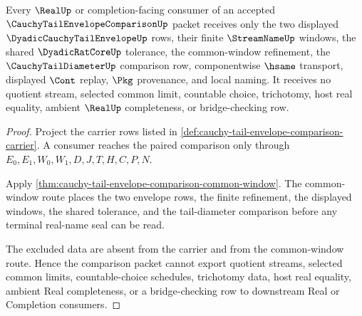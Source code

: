 \begin{theorem}
\label{thm:cauchy-tail-envelope-comparison-nonescape}
Every $\RealUp$ or completion-facing consumer of an accepted $\CauchyTailEnvelopeComparisonUp$ packet receives only the two displayed $\DyadicCauchyTailEnvelopeUp$ rows, their finite $\StreamNameUp$ windows, the shared $\DyadicRatCoreUp$ tolerance, the common-window refinement, the $\CauchyTailDiameterUp$ comparison row, componentwise $\hsame$ transport, displayed $\Cont$ replay, $\Pkg$ provenance, and local naming. It receives no quotient stream, selected common limit, countable choice, trichotomy, host real equality, ambient $\RealUp$ completeness, or bridge-checking row.
\end{theorem}
\begin{proof}
Project the carrier rows listed in \autoref{def:cauchy-tail-envelope-comparison-carrier}. A consumer reaches the paired comparison only through $E_0,E_1,W_0,W_1,D,J,T,H,C,P,N$.

Apply \autoref{thm:cauchy-tail-envelope-comparison-common-window}. The common-window route places the two envelope rows, the finite refinement, the displayed windows, the shared tolerance, and the tail-diameter comparison before any terminal real-name seal can be read.

The excluded data are absent from the carrier and from the common-window route. Hence the comparison packet cannot export quotient streams, selected common limits, countable-choice schedules, trichotomy data, host real equality, ambient Real completeness, or a bridge-checking row to downstream Real or Completion consumers.
\end{proof}


\begin{closurestatus}{\CauchyTailEnvelopeComparisonUp}
  \theoryclosure{\seedClosure}
  \formalstatus{\unformalizedV}
\end{closurestatus}
